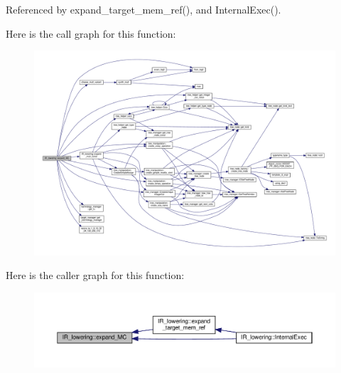 Referenced by expand\+\_\+target\+\_\+mem\+\_\+ref(), and Internal\+Exec().

Here is the call graph for this function\+:
\nopagebreak
\begin{figure}[H]
\begin{center}
\leavevmode
\includegraphics[width=350pt]{df/d7d/classIR__lowering_a00b8351a51bd62d131105fc1098bd0f7_cgraph}
\end{center}
\end{figure}
Here is the caller graph for this function\+:
\nopagebreak
\begin{figure}[H]
\begin{center}
\leavevmode
\includegraphics[width=350pt]{df/d7d/classIR__lowering_a00b8351a51bd62d131105fc1098bd0f7_icgraph}
\end{center}
\end{figure}
\mbox{\label{classIR__lowering_ae6f7d0298f7b68ce521fc42e769a090f}} 
